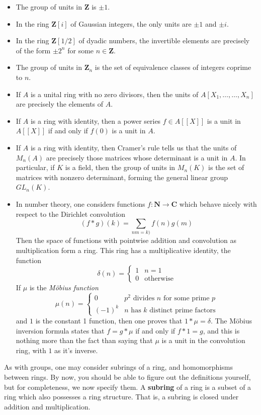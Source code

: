 \begin{itemize}
    \item The group of units in $\mathbf{Z}$ is $\pm 1$.

    \item In the ring $\mathbf{Z}[i]$ of Gaussian integers, the only units are $\pm 1$ and $\pm i$.

    \item In the ring $\mathbf{Z}[1/2]$ of dyadic numbers, the invertible elements are precisely of the form $\pm 2^n$ for some $n \in \mathbf{Z}$.

    \item The group of units in $\mathbf{Z}_n$ is the set of equivalence classes of integers coprime to $n$.

    \item If $A$ is a unital ring with no zero divisors, then the units of $A[X_1, \dots, \dots, X_n]$ are precisely the elements of $A$.

    \item If $A$ is a ring with identity, then a power series $f \in A[[X]]$ is a unit in $A[[X]]$ if and only if $f(0)$ is a unit in $A$.

    \item If $A$ is a ring with identity, then Cramer's rule tells us that the units of $M_n(A)$ are precisely those matrices whose determinant is a unit in $A$. In particular, if $K$ is a field, then the group of units in $M_n(K)$ is the set of matrices with nonzero determinant, forming the general linear group $GL_n(K)$.

    \item In number theory, one considers functions $f: \mathbf{N} \to \mathbf{C}$ which behave nicely with respect to the Dirichlet convolution
    \[ (f * g)(k) = \sum_{nm = k)} f(n) g(m) \]
    Then the space of functions with pointwise addition and convolution as multiplication form a ring. This ring has a multiplicative identity, the function
    \[ \delta(n) = \begin{cases} 1 & n = 1 \\ 0 & \text{otherwise} \end{cases} \]
    If $\mu$ is the {\it M\"{o}bius function}
    \[ \mu(n) = \begin{cases} 0 & \text{$p^2$ divides $n$ for some prime $p$} \\ (-1)^k & \text{$n$ has $k$ distinct prime factors} \end{cases} \]
    and $1$ is the constant 1 function, then one proves that $1 * \mu = \delta$. The M\"{o}bius inversion formula states that $f = g * \mu$ if and only if $f * 1 = g$, and this is nothing more than the fact than saying that $\mu$ is a unit in the convolution ring, with $1$ as it's inverse.
\end{itemize}
%
As with groups, one may consider subrings of a ring, and homomorphisms between rings. By now, you should be able to figure out the definitions yourself, but for completeness, we now specify them. A {\bf subring} of a ring is a subset of a ring which also possesses a ring structure. That is, a subring is closed under addition and multiplication.

